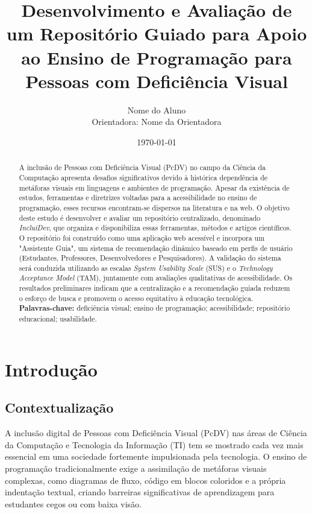 \documentclass[12pt, a4paper, oneside]{article}
\title{Desenvolvimento e Avaliação de um Repositório Guiado para Apoio ao Ensino de Programação para Pessoas com Deficiência Visual}
\author{Nome do Aluno \\ Orientadora: Nome da Orientadora}
\date{\today}
\begin{document}
\maketitle

\begin{abstract}
A inclusão de Pessoas com Deficiência Visual (PcDV) no campo da Ciência da Computação apresenta desafios significativos devido à histórica dependência de metáforas visuais em linguagens e ambientes de programação. Apesar da existência de estudos, ferramentas e diretrizes voltadas para a acessibilidade no ensino de programação, esses recursos encontram-se dispersos na literatura e na web. O objetivo deste estudo é desenvolver e avaliar um repositório centralizado, denominado \textit{IncluiDev}, que organiza e disponibiliza essas ferramentas, métodos e artigos científicos. O repositório foi construído como uma aplicação web acessível e incorpora um "Assistente Guia", um sistema de recomendação dinâmico baseado em perfis de usuário (Estudantes, Professores, Desenvolvedores e Pesquisadores). A validação do sistema será conduzida utilizando as escalas \textit{System Usability Scale} (SUS) e o \textit{Technology Acceptance Model} (TAM), juntamente com avaliações qualitativas de acessibilidade. Os resultados preliminares indicam que a centralização e a recomendação guiada reduzem o esforço de busca e promovem o acesso equitativo à educação tecnológica.
\\
\textbf{Palavras-chave:} deficiência visual; ensino de programação; acessibilidade; repositório educacional; usabilidade.
\end{abstract}

\section{Introdução}

\subsection{Contextualização}
A inclusão digital de Pessoas com Deficiência Visual (PcDV) nas áreas de Ciência da Computação e Tecnologia da Informação (TI) tem se mostrado cada vez mais essencial em uma sociedade fortemente impulsionada pela tecnologia. O ensino de programação tradicionalmente exige a assimilação de metáforas visuais complexas, como diagramas de fluxo, código em blocos coloridos e a própria indentação textual, criando barreiras significativas de aprendizagem para estudantes cegos ou com baixa visão.
\end{document}
